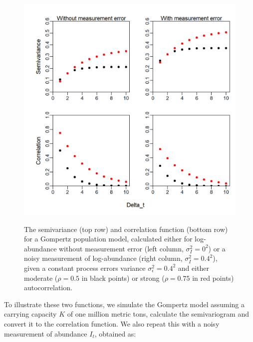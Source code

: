 \begin{figure}[!ht]
    \caption[Semivariance and correlation for first-order autoregressive process]{The semivariance (top row) and correlation function (bottom row) for a Gompertz population model, calculated either for log-abundance without measurement error (left column, \(\sigma_I^2=0^2\)) or a noisy measurement of log-abundance (right column, \(\sigma_I^2=0.4^2\)), given a constant process errors variance \(\sigma_{\epsilon}^2=0.4^2\) and either moderate (\(\rho=0.5\) in black points) or strong (\(\rho=0.75\) in red points) autocorrelation.}
    \centering
    \includegraphics[width=5.5in]{Chap_3/Gompertz_semivariance.png}
    \label{fig:Chap3_semivariance}
\end{figure}

To illustrate these two functions, we simulate the Gompertz model assuming a carrying capacity \(K\) of one million metric tons, calculate the semivariogram and convert it to the correlation function.  We also repeat this with a noisy measurement of abundance \(I_t\), obtained as:

